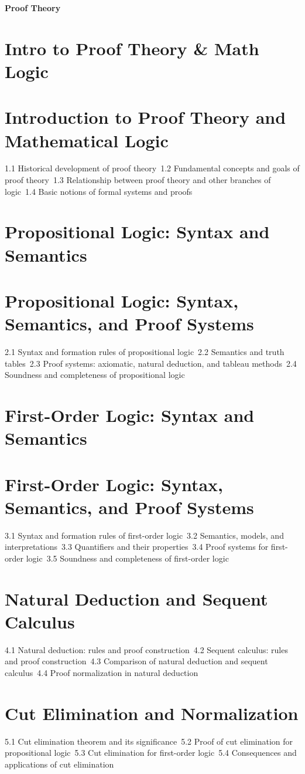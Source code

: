 {\LARGE \bf{Proof Theory}}
\section{Intro to Proof Theory \& Math Logic}
\section{Introduction to Proof Theory and Mathematical Logic}
1.1 Historical development of proof theory\
1.2 Fundamental concepts and goals of proof theory\
1.3 Relationship between proof theory and other branches of logic\
1.4 Basic notions of formal systems and proofs\
\section{Propositional Logic: Syntax and Semantics}
\section{Propositional Logic: Syntax, Semantics, and Proof Systems}
2.1 Syntax and formation rules of propositional logic\
2.2 Semantics and truth tables\
2.3 Proof systems: axiomatic, natural deduction, and tableau methods\
2.4 Soundness and completeness of propositional logic\
\section{First-Order Logic: Syntax and Semantics}
\section{First-Order Logic: Syntax, Semantics, and Proof Systems}
3.1 Syntax and formation rules of first-order logic\
3.2 Semantics, models, and interpretations\
3.3 Quantifiers and their properties\
3.4 Proof systems for first-order logic\
3.5 Soundness and completeness of first-order logic\
\section{Natural Deduction and Sequent Calculus}
4.1 Natural deduction: rules and proof construction\
4.2 Sequent calculus: rules and proof construction\
4.3 Comparison of natural deduction and sequent calculus\
4.4 Proof normalization in natural deduction\
\section{Cut Elimination and Normalization}
5.1 Cut elimination theorem and its significance\
5.2 Proof of cut elimination for propositional logic\
5.3 Cut elimination for first-order logic\
5.4 Consequences and applications of cut elimination\
